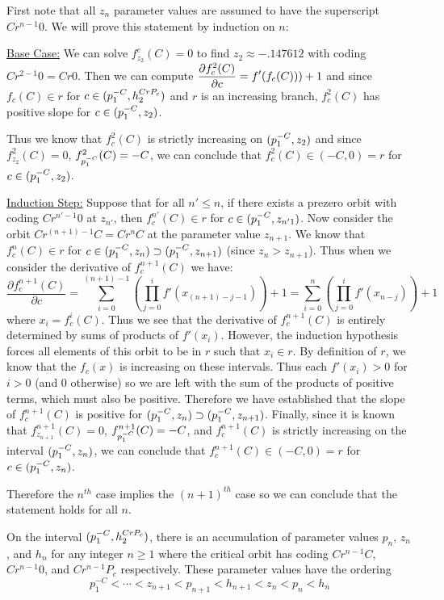 		\begin{myproof}
			First note that all $z_n$ parameter values are assumed to have the superscript $Cr^{n-1}0$. We will prove this statement by induction on $n$:

			\underline{Base Case:} We can solve $f^c_{z_2} (C)=0$ to find $z_2 \approx -.147612$ with coding $Cr^{2-1}0 = Cr0$. Then we can compute $\displaystyle\frac{\partial f^2_c (C)}{\partial c} = f' (f_c (C)))+1$ and since $f_c (C) \in r$ for $c \in (p^{-C}_1, h^{CrP_c}_2)$ and $r$ is an increasing branch, $f_{c}^2 (C)$ has positive slope for $c \in (p^{-C}_1, z_2)$.

			Thus we know that $f^2_c (C)$ is strictly increasing on $ (p^{-C}_1, z_2)$ and since $f^2_{z_2} (C) = 0$, $f^2_{p^{-C}_1} (C) = -C$, we can conclude that $f^2_c (C) \in (-C, 0) = r$ for $c \in (p^{-C}_1, z_2)$.

			\underline{Induction Step:} Suppose that for all $n' \leq n$, if there exists a prezero orbit with coding $Cr^{n'-1}0$ at $z_{n'}$, then $f^{n'}_{c} (C) \in r$ for $c \in (p^{-C}_1, z_{n'1})$. Now consider the orbit $Cr^{ (n+1)-1}C = Cr^{n}C$ at the parameter value $z_{n+1}$. We know that $f^n_c (C) \in r$ for $c \in (p^{-C}_1, z_n) \supset (p^{-C}_1, z_{n+1})$ (since $z_n > z_{n+1}$). Thus when we consider the derivative of $f^{n+1}_{c} (C)$ we have:
			\[
				\frac{\partial f^{n+1}_c (C)}{\partial c} = \sum^{ (n + 1) - 1}_{i=0}\left (\prod^i_{j=0} f' (x_{ (n+1)-j-1})\right) + 1 =  \sum^{n}_{i=0}\left (\prod^i_{j=0} f' (x_{n-j})\right) + 1
			\]
			where $x_i = f^i_c (C)$. Thus we see that the derivative of $f^{n+1}_c (C)$ is entirely determined by sums of products of $f' (x_i)$. However, the induction hypothesis forces all elements of this orbit to be in $r$ such that $x_i \in r$. By definition of $r$, we know that the $f_c (x)$ is increasing on these intervals. Thus each $f' (x_i)>0$ for $i > 0$ (and 0 otherwise) so we are left with the sum of the products of positive terms, which must also be positive. Therefore we have established that the slope of $f^{n+1}_c (C)$ is positive for $ (p^{-C}_1, z_n) \supset (p^{-C}_1, z_{n+1})$. Finally, since it is known that $f^{n+1}_{z_{n+1}} (C) = 0$, $f^{n+1}_{p^{-C}_1} (C) = -C$, and $f^{n+1}_c (C)$ is strictly increasing on the interval $ (p^{-C}_1, z_n)$, we can conclude that $f^{n+1}_c (C) \in (-C, 0) = r$ for $c \in (p^{-C}_1, z_n)$.

			Therefore the $n^{th}$ case implies the $ (n+1)^{th}$ case so we can conclude that the statement holds for all $n$.
		\end{myproof}

		\begin{myprop} \label{sadaccum}
			On the interval $ (p^{-C}_1, h^{CrP_c}_2)$, there is an accumulation of parameter values $p_n$, $z_n$, and $h_n$ for any integer $n \geq 1$ where the critical orbit has coding $Cr^{n-1}C$, $Cr^{n-1}0$, and $Cr^{n-1}P_c$ respectively. These parameter values have the ordering
			\[
			p_1^{-C} < \cdots < z_{n+1} < p_{n+1} < h_{n+1} < z_n < p_n < h_n
			\]
		\end{myprop}

